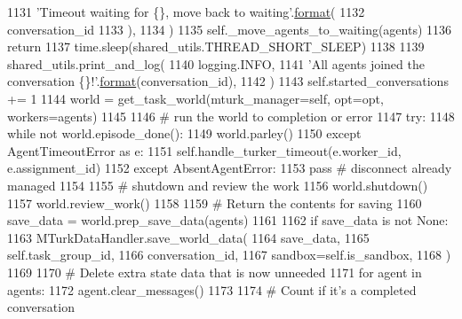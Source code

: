 \begin{DoxyCode}
1131                         \textcolor{stringliteral}{'Timeout waiting for \{\}, move back to waiting'}.\hyperlink{namespaceparlai_1_1chat__service_1_1services_1_1messenger_1_1shared__utils_a32e2e2022b824fbaf80c747160b52a76}{format}(
1132                             conversation\_id
1133                         ),
1134                     )
1135                     self.\_move\_agents\_to\_waiting(agents)
1136                     \textcolor{keywordflow}{return}
1137                 time.sleep(shared\_utils.THREAD\_SHORT\_SLEEP)
1138 
1139             shared\_utils.print\_and\_log(
1140                 logging.INFO,
1141                 \textcolor{stringliteral}{'All agents joined the conversation \{\}!'}.\hyperlink{namespaceparlai_1_1chat__service_1_1services_1_1messenger_1_1shared__utils_a32e2e2022b824fbaf80c747160b52a76}{format}(conversation\_id),
1142             )
1143             self.started\_conversations += 1
1144             world = get\_task\_world(mturk\_manager=self, opt=opt, workers=agents)
1145 
1146             \textcolor{comment}{# run the world to completion or error}
1147             \textcolor{keywordflow}{try}:
1148                 \textcolor{keywordflow}{while} \textcolor{keywordflow}{not} world.episode\_done():
1149                     world.parley()
1150             \textcolor{keywordflow}{except} AgentTimeoutError \textcolor{keyword}{as} e:
1151                 self.handle\_turker\_timeout(e.worker\_id, e.assignment\_id)
1152             \textcolor{keywordflow}{except} AbsentAgentError:
1153                 \textcolor{keywordflow}{pass}  \textcolor{comment}{# disconnect already managed}
1154 
1155             \textcolor{comment}{# shutdown and review the work}
1156             world.shutdown()
1157             world.review\_work()
1158 
1159             \textcolor{comment}{# Return the contents for saving}
1160             save\_data = world.prep\_save\_data(agents)
1161 
1162             \textcolor{keywordflow}{if} save\_data \textcolor{keywordflow}{is} \textcolor{keywordflow}{not} \textcolor{keywordtype}{None}:
1163                 MTurkDataHandler.save\_world\_data(
1164                     save\_data,
1165                     self.task\_group\_id,
1166                     conversation\_id,
1167                     sandbox=self.is\_sandbox,
1168                 )
1169 
1170             \textcolor{comment}{# Delete extra state data that is now unneeded}
1171             \textcolor{keywordflow}{for} agent \textcolor{keywordflow}{in} agents:
1172                 agent.clear\_messages()
1173 
1174             \textcolor{comment}{# Count if it's a completed conversation}

\end{DoxyCode}
